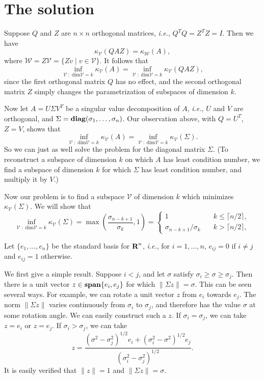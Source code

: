 \documentclass[12pt]{article}
\newcommand{\ie}{{\it i.e.}}%
\newcommand{\reals}{{\mbox{\bf R}}}%
\newcommand{\Span}{\mathop{\bf span}}%
\newcommand{\diag}{\mathop{\bf diag}}%
\begin{document}
\section{The solution}

Suppose $Q$ and $Z$ are $n \times n$ orthogonal matrices,
\ie, $Q^TQ=Z^TZ=I$.  Then we have
\[
\kappa_{\mathcal V} (QAZ) = \kappa_{\mathcal W} (A),
\]
where $\mathcal W = Z \mathcal V = \{ Zv \;|\; v \in \mathcal V \}$.
It follows that
\[
\inf_{\mathcal V\;:\; \mathrm{dim} \mathcal V =k}
\kappa_{\mathcal V} (A) =
\inf_{\mathcal V\;:\;\mathrm{dim} \mathcal V=k}
\kappa_{\mathcal V} (QAZ),
\]
since the first orthogonal matrix $Q$ has no effect,
and the second
orthogonal matrix $Z$ simply changes the parametrization of 
subspaces of dimension $k$.

Now let $A=U \Sigma V^T$ be a
singular value decomposition of $A$, \ie,
$U$ and $V$ are orthogonal, and
$\Sigma = \diag (\sigma_1, \ldots, \sigma_n)$.
Our observation above, with $Q=U^T$, $Z=V$, shows that
\[
\inf_{\mathcal V\;:\;\mathrm{dim} \mathcal V =k}
\kappa_{\mathcal V} (A) =
\inf_{\mathcal V\;:\;\mathrm{dim} \mathcal V =k}
\kappa_{\mathcal V} (\Sigma).
\]
So we can just as well solve the problem for the 
diagonal matrix $\Sigma$.  
(To reconstruct a subspace of dimension $k$ on which $A$
has least condition number, we find a subspace of dimension
$k$ for which $\Sigma$ has least condition number, and multiply
it by $V$.)

Now our problem is to find a subspace $\mathcal{V}$ of
dimension $k$ which minimizes $\kappa_\mathcal{V}(\Sigma)$.
We will show that 
\begin{equation}
\label{sol2}
\inf_{\mathcal V\;:\; \mathrm{dim} \mathcal V =k}
\kappa_{\mathcal V} (\Sigma) =
\max \left(\frac{\sigma_{n-k+1}}{\sigma_k}, 1 \right)
= \left\{ \begin{array}{ll} 
1 & \quad  k \leq \lceil n/2 \rceil,\\
\sigma_{n-k+1} / \sigma_k & \quad  k > \lceil n/2 \rceil,
\end{array}\right.
\end{equation}

Let $\{e_1, \ldots, e_n\}$ be the standard basis for $\reals^n$,
\ie, for $i=1,\ldots, n$, $e_{ij} = 0$ if $i \neq j$ and $e_{ij}
= 1$ otherwise.

We first give a simple result. 
Suppose $i<j$, and let $\sigma$ satisfy
$\sigma_i \geq \sigma \geq \sigma_j$.
Then there is a unit vector $z \in \Span \{e_i,e_j\}$ for
which $\|\Sigma z\|=\sigma$.
This can be seen several ways. For example, we can rotate
a unit vector $z$ from $e_i$ towards $e_j$.  The norm $\|
\Sigma z\|$ varies continuously from $\sigma_i$ to $\sigma_j$,
and therefore has the value $\sigma$ at some rotation angle.
We can easily construct such a $z$.
If $\sigma_i = \sigma_j$, we can take $z = e_i$ or $z = e_j$.
If $\sigma_i > \sigma_j$, we can take
\[
z =  \frac{ (\sigma^2 - \sigma_j^2 )^{1/2} e_i +
(\sigma_i^2 - \sigma^2 )^{1/2} e_j}
{ ( \sigma_i^2 - \sigma_j^2 )^{1/2} }.
\]
It is easily verified that $\|z\| = 1$ and $\| \Sigma z\| =
\sigma$.
\end{document}
